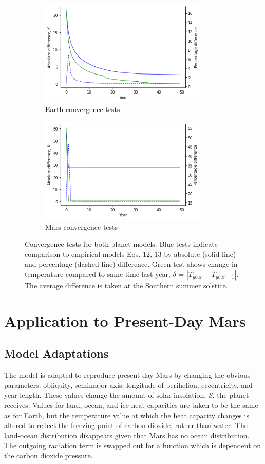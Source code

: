 \documentclass[12pt,onecolumn]{revtex4-2}    %
\begin{document}
\begin{figure}
\begin{subfigure}{.5\textwidth}
  \centering
  \includegraphics[width = 8cm]{Convergence.png}
  \caption{Earth convergence tests}
  \label{fig:sub1}
\end{subfigure}%
\begin{subfigure}{.5\textwidth}
  \centering
  \includegraphics[width=8cm]{MarsConvergence.png}
  \caption{Mars convergence tests}
  \label{fig:sub2}
\end{subfigure}
\raggedright
\caption{Convergence tests for both planet models. Blue tests indicate comparison to empirical models Eqs. 12, 13 by absolute (solid line) and percentage (dashed line) difference. Green test shows change in temperature compared to same time last year, $\delta$ = $|T_{year} - T_{year-1}|$. The average difference is taken at the Southern summer solstice.}
\label{fig:test}
\end{figure}

\section{Application to Present-Day Mars}
\subsection{Model Adaptations}

The model is adapted to reproduce present-day Mars by changing the obvious parameters: obliquity, semimajor axis, longitude of perihelion, eccentricity, and year length. These values change the amount of solar insolation, \textit{S}, the planet receives. Values for land, ocean, and ice heat capacities are taken to be the same as for Earth, but the temperature value at which the heat capacity changes is altered to reflect the freezing point of carbon dioxide, rather than water. The land-ocean distribution disappears given that Mars has no ocean distribution. The outgoing radiation term is swapped out for a function which is dependent on the carbon dioxide pressure. 
\end{document}
